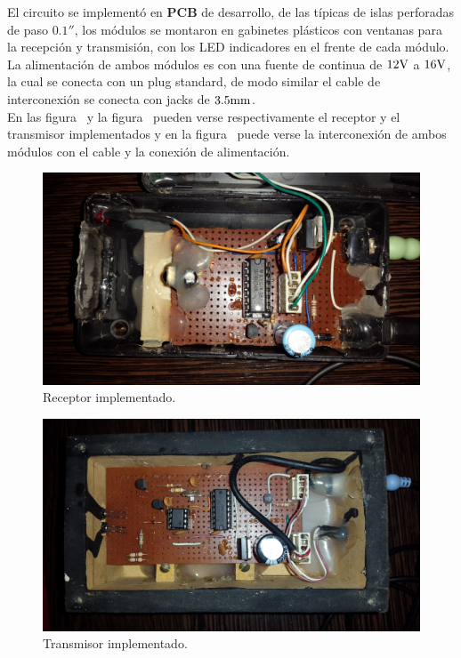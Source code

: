 
El circuito se implementó en \textbf{PCB} de desarrollo, de las típicas de islas perforadas de paso $0.1''$, los módulos se montaron en gabinetes plásticos con ventanas para la recepción y transmisión, con los LED indicadores en el frente de cada módulo. La alimentación de ambos módulos es con una fuente de continua de $12 \si[per-mode=symbol]{\volt}$ a $16 \si[per-mode=symbol]{\volt}$, la cual se conecta con un plug standard, de modo similar el cable de interconexión se conecta con jacks de $3.5 \si[per-mode=symbol]{\milli\meter}$. \\

En las figura~ y la figura~ pueden verse respectivamente el receptor y el transmisor implementados y en la figura~ puede verse la interconexión de ambos módulos con el cable y la conexión de alimentación.

\clearpage

\begin{figure}[H]
	\centering
	\includegraphics[width=0.9\paperwidth, angle=90]{img/REAL/receiver.jpg}
	\caption{\footnotesize{Receptor implementado.}}
	\label{fig:IR_receiver_real}
\end{figure}


\clearpage


\begin{figure}[H]
	\centering
	\includegraphics[width=0.9\paperwidth, angle=90]{img/REAL/transmitter.jpg}
	\caption{\footnotesize{Transmisor implementado.}}
	\label{fig:IR_transmitter_real}
\end{figure}


